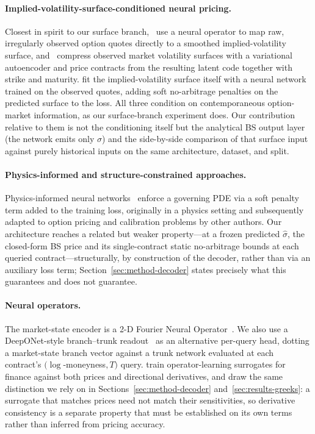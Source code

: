 \documentclass[11pt]{article}
\begin{document}
\paragraph{Implied-volatility-surface-conditioned neural pricing.} Closest in spirit to our surface
branch,~\citet{Wiedemann2025OpDeepSmoothing} use a neural operator to map raw, irregularly observed
option quotes directly to a smoothed implied-volatility surface, and~\citet{Ding2025DLIVSurfaces}
compress observed market volatility surfaces with a variational autoencoder and price contracts from
the resulting latent code together with strike and maturity. \citet{Ackerer2020DeepSmoothing} fit the
implied-volatility surface itself with a neural network trained on the observed quotes, adding soft
no-arbitrage penalties on the predicted surface to the loss. All three condition on contemporaneous
option-market information, as our surface-branch experiment does. Our contribution relative to them is not the
conditioning itself but the analytical BS output layer (the network emits only $\hat\sigma$) and the
side-by-side comparison of that surface input against purely historical inputs on the same
architecture, dataset, and split.

\paragraph{Physics-informed and structure-constrained approaches.} Physics-informed neural
networks~\citep{Raissi2019PINN} enforce a governing PDE via a soft penalty term added to the training loss,
originally in a physics setting and subsequently adapted to option pricing and calibration problems by
other authors. Our architecture reaches a related but weaker property---at a frozen predicted
$\hat\sigma$, the closed-form BS price and its single-contract static no-arbitrage bounds at each
queried contract---structurally, by construction of the decoder, rather than via an auxiliary loss
term; Section~\ref{sec:method-decoder} states precisely what this guarantees and does not guarantee.

\paragraph{Neural operators.} The market-state encoder is a 2-D Fourier Neural
Operator~\citep{Li2021FNO}. We also use a DeepONet-style branch--trunk readout~\citep{Lu2021DeepONet} as an
alternative per-query head, dotting a market-state branch vector against a trunk network evaluated at
each contract's $(\log$-moneyness$, T)$ query. \citet{NoguerIAlonso2026DerivInformed} train
operator-learning surrogates for finance against both prices and directional derivatives, and draw the
same distinction we rely on in Sections~\ref{sec:method-decoder} and~\ref{sec:results-greeks}: a
surrogate that matches prices need not match their sensitivities, so derivative consistency is a
separate property that must be established on its own terms rather than inferred from pricing
accuracy.
\end{document}
